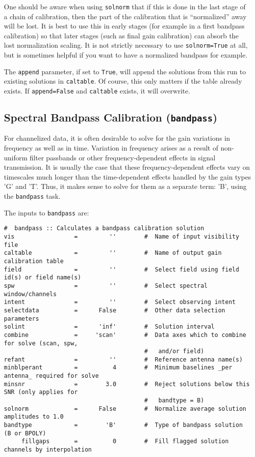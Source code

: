 {One should be aware when using {\tt solnorm} that if this is done
in the last stage of a chain of calibration, then the part of 
the calibration that is ``normalized'' away will be lost.  It is
best to use this in early stages (for example in a first bandpass
calibration) so that later stages (such as final gain calibration)
can absorb the lost normalization scaling.  It is not strictly
necessary to use {\tt solnorm=True} at all, but is sometimes helpful
if you want to have a normalized bandpass for example.

The {\tt append} parameter, if set to {\tt True}, will append the
solutions from this run to existing solutions in {\tt caltable}.
Of course, this only matters if the table already exists.  If
{\tt append=False} and {\tt caltable} exists, it will overwrite.

\subsection{Spectral Bandpass Calibration ({\tt bandpass})}
\label{section:cal.solve.band}

For channelized data, it is often desirable to solve for the gain
variations in frequency as well as in time.  Variation in frequency
arises as a result of non-uniform filter passbands or other frequency-dependent
effects in signal transmission.  It is usually the case that these
frequency-dependent effects vary on timescales much longer than the
time-dependent effects handled by the gain types 'G' and 'T'.  
Thus, it makes sense to solve for them as a separate term: 'B', using the
{\tt bandpass} task.

The inputs to {\tt bandpass} are:
\small
\begin{verbatim}
#  bandpass :: Calculates a bandpass calibration solution
vis                 =         ''        #  Name of input visibility file
caltable            =         ''        #  Name of output gain calibration table
field               =         ''        #  Select field using field id(s) or field name(s)
spw                 =         ''        #  Select spectral window/channels
intent              =         ''        #  Select observing intent
selectdata          =      False        #  Other data selection parameters
solint              =      'inf'        #  Solution interval
combine             =     'scan'        #  Data axes which to combine for solve (scan, spw,
                                        #   and/or field)
refant              =         ''        #  Reference antenna name(s)
minblperant         =          4        #  Minimum baselines _per antenna_ required for solve
minsnr              =        3.0        #  Reject solutions below this SNR (only applies for
                                        #   bandtype = B)
solnorm             =      False        #  Normalize average solution amplitudes to 1.0
bandtype            =        'B'        #  Type of bandpass solution (B or BPOLY)
     fillgaps       =          0        #  Fill flagged solution channels by interpolation


\end{verbatim}}
